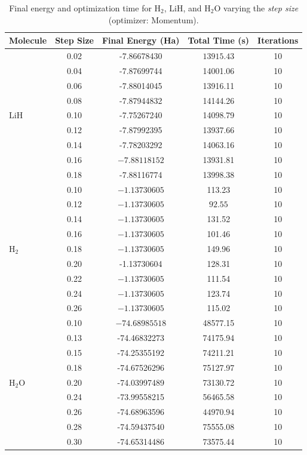 \begin{table}[H]
  \centering
  \caption{Final energy and optimization time for \(\mathrm{H_2}\), \(\mathrm{LiH}\), and \(\mathrm{H_2O}\) varying the \textit{step size} (optimizer: Momentum).}
  \begin{scriptsize}
  \begin{tabular}{lcccc}
  \toprule
  \textbf{Molecule} & \textbf{Step Size} & \textbf{Final Energy (Ha)} & \textbf{Total Time (s)} & \textbf{Iterations} \\
  \midrule
  \multirow{9}{*}{\(\mathrm{LiH}\)} 
  & 0.02 & -7.86678430 & \(\mathbf{13915.43}\) & 10 \\
  & 0.04 & -7.87699744 & 14001.06 & 10 \\
  & 0.06 & -7.88014045 & 13916.11 & 10 \\
  & 0.08 & -7.87944832 & 14144.26 & 10 \\
  & 0.10 & -7.75267240 & 14098.79 & 10 \\
  & 0.12 & -7.87992395 & 13937.66 & 10 \\
  & 0.14 & -7.78203292 & 14063.16 & 10 \\
  & 0.16 & \(\mathbf{-7.88118152}\) & 13931.81 & 10 \\
  & 0.18 & -7.88116774 & 13998.38 & 10 \\
  \midrule
  \multirow{9}{*}{\(\mathrm{H_2}\)} 
  & 0.10 & \(\mathbf{-1.13730605}\) & 113.23 & 10 \\
  & 0.12 & \(\mathbf{-1.13730605}\) & \(\mathbf{92.55}\) & 10 \\
  & 0.14 & \(\mathbf{-1.13730605}\) & 131.52 & 10 \\
  & 0.16 & \(\mathbf{-1.13730605}\) & 101.46 & 10 \\
  & 0.18 & \(\mathbf{-1.13730605}\) & 149.96 & 10 \\
  & 0.20 & -1.13730604 & 128.31 & 10 \\
  & 0.22 & \(\mathbf{-1.13730605}\) & 111.54 & 10 \\
  & 0.24 & \(\mathbf{-1.13730605}\) & 123.74 & 10 \\
  & 0.26 & \(\mathbf{-1.13730605}\) & 115.02 & 10 \\
  \midrule
  \multirow{9}{*}{\(\mathrm{H_2O}\)} 
  & 0.10 & \(\mathbf{-74.68985518}\) & 48577.15 & 10 \\
  & 0.13 & -74.46832273 & 74175.94 & 10 \\
  & 0.15 & -74.25355192 & 74211.21 & 10 \\
  & 0.18 & -74.67526296 & 75127.97 & 10 \\
  & 0.20 & -74.03997489 & 73130.72 & 10 \\
  & 0.24 & -73.99558215 & 56465.58 & 10 \\
  & 0.26 & -74.68963596 & \(\mathbf{44970.94}\) & 10 \\
  & 0.28 & -74.59437540 & 75555.08 & 10 \\
  & 0.30 & -74.65314486 & 73575.44 & 10 \\
  \bottomrule
  \end{tabular}
\end{scriptsize}
\end{table}

